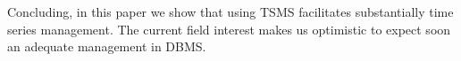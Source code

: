 

Concluding, in this paper we show that using TSMS facilitates
substantially time series management. The current field interest makes
us optimistic to expect soon an adequate management in
DBMS.











